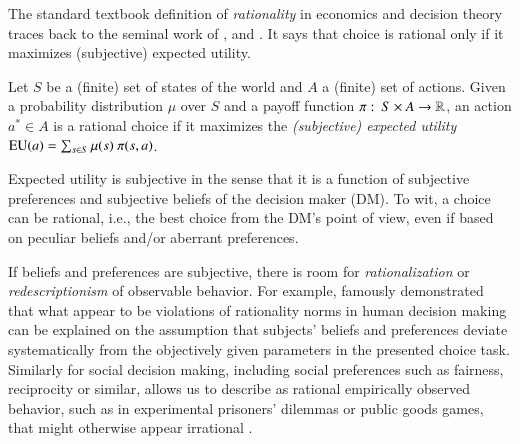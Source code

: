 \documentclass[fleqn,reqno,11pt]{article}
\begin{document}
The standard textbook definition of \textit{rationality} in economics and decision theory
traces back to the seminal work of \citet{deFinetti37}, \citet{Neumannvon-NeumannMorgenstern1944:Theory-of-Games}
and \citet{Savage1954:The-Foundations}. It says that choice is rational only if it maximizes
(subjective) expected utility.

\begin{definition}
  \label{def:rationality}
  Let $S$ be a (finite) set of states of the world and $A$ a (finite) set of actions. Given a
  probability distribution $\mu$ over $S$ and a payoff function
  $\pi \thinspace \colon \thinspace S \times A \rightarrow \mathbb{R} $, an action $a^* \in A$ is a rational choice
  if it maximizes the \emph{(subjective) expected utility}
  $\EU(a) = \sum_{s \in S} \mu(s) \ \pi(s, a)$.
\end{definition}

\noindent Expected utility is subjective in the sense that it is a function of subjective
preferences and subjective beliefs of the decision maker (DM). To wit, a choice can be
rational, i.e., the best choice from the DM's point of view, even if based on peculiar beliefs
and/or aberrant preferences. %

If beliefs and preferences are subjective, there is room for \emph{rationalization} or
\emph{redescriptionism} of observable behavior. For example,
\citet{KahnemannTversky1979:Prospect-Theory} famously demonstrated that what appear to be
violations of rationality norms in human decision making can be explained on the assumption
that subjects' beliefs and preferences deviate systematically from the objectively given
parameters in the presented choice task. Similarly for social decision making, including social
preferences such as fairness, reciprocity or similar, allows us to describe as rational
empirically observed behavior, such as in experimental prisoners' dilemmas or public goods
games, that might otherwise appear irrational \citep[e.g.,][]{fehrschmidt99,charrab02}.
\end{document}
